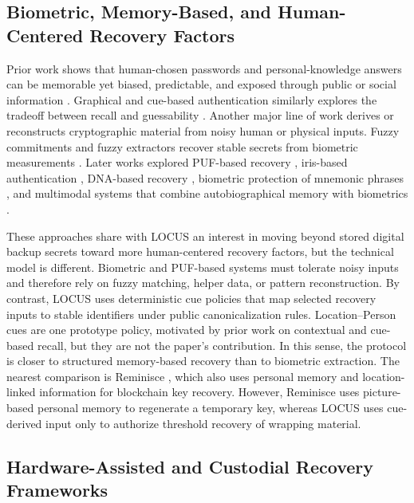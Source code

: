 \subsection{Biometric, Memory-Based, and Human-Centered Recovery Factors}

Prior work shows that human-chosen passwords and personal-knowledge answers can be memorable yet biased, predictable, and exposed through public or social information \cite{Bonneau2012Quest,Bonneau2015Secrets,Yan2004Password}. Graphical and cue-based authentication similarly explores the tradeoff between recall and guessability \cite{Biddle2012Graphical}. Another major line of work derives or reconstructs cryptographic material from noisy human or physical inputs. Fuzzy commitments and fuzzy extractors recover stable secrets from biometric measurements \cite{FuzzyCommitment1999,FuzzyExtractors2004}. Later works explored PUF-based recovery \cite{PUF2011,RBC2020}, iris-based authentication \cite{Iris2019}, DNA-based recovery \cite{DNABioCrypto2023}, biometric protection of mnemonic phrases \cite{LeakableMnemonic2024}, and multimodal systems that combine autobiographical memory with biometrics \cite{LifeXP2025}.

These approaches share with \textsf{LOCUS} an interest in moving beyond stored digital backup secrets toward more human-centered recovery factors, but the technical model is different. Biometric and PUF-based systems must tolerate noisy inputs and therefore rely on fuzzy matching, helper data, or pattern reconstruction. By contrast, \textsf{LOCUS} uses deterministic cue policies that map selected recovery inputs to stable identifiers under public canonicalization rules. Location--Person cues are one prototype policy, motivated by prior work on contextual and cue-based recall, but they are not the paper's contribution. In this sense, the protocol is closer to structured memory-based recovery than to biometric extraction. The nearest comparison is Reminisce \cite{Reminisce2022}, which also uses personal memory and location-linked information for blockchain key recovery. However, Reminisce uses picture-based personal memory to regenerate a temporary key, whereas \textsf{LOCUS} uses cue-derived input only to authorize threshold recovery of wrapping material.

\subsection{Hardware-Assisted and Custodial Recovery Frameworks}

